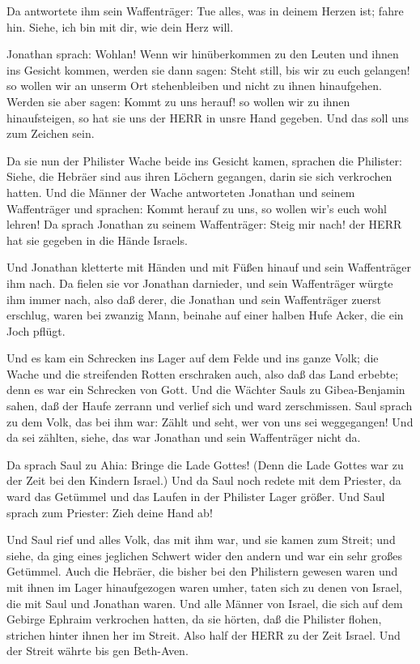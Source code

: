 Da antwortete ihm sein Waffenträger: Tue alles, was in
deinem Herzen ist; fahre hin. Siehe, ich bin mit dir, wie dein Herz
will.

 Jonathan sprach: Wohlan! Wenn wir hinüberkommen zu den
Leuten und ihnen ins Gesicht kommen,  werden sie dann sagen:
Steht still, bis wir zu euch gelangen! so wollen wir an unserm Ort
stehenbleiben und nicht zu ihnen hinaufgehen.  Werden sie
aber sagen: Kommt zu uns herauf! so wollen wir zu ihnen hinaufsteigen,
so hat sie uns der HERR in unsre Hand gegeben. Und das soll uns zum
Zeichen sein.

 Da sie nun der Philister Wache beide ins Gesicht kamen,
sprachen die Philister: Siehe, die Hebräer sind aus ihren Löchern
gegangen, darin sie sich verkrochen hatten.  Und die Männer
der Wache antworteten Jonathan und seinem Waffenträger und sprachen:
Kommt herauf zu uns, so wollen wir's euch wohl lehren! Da sprach
Jonathan zu seinem Waffenträger: Steig mir nach! der HERR hat sie
gegeben in die Hände Israels.

 Und Jonathan kletterte mit Händen und mit Füßen hinauf und
sein Waffenträger ihm nach. Da fielen sie vor Jonathan darnieder, und
sein Waffenträger würgte ihm immer nach,  also daß derer,
die Jonathan und sein Waffenträger zuerst erschlug, waren bei zwanzig
Mann, beinahe auf einer halben Hufe Acker, die ein Joch pflügt.

 Und es kam ein Schrecken ins Lager auf dem Felde und ins
ganze Volk; die Wache und die streifenden Rotten erschraken auch, also
daß das Land erbebte; denn es war ein Schrecken von Gott. 
Und die Wächter Sauls zu Gibea-Benjamin sahen, daß der Haufe zerrann und
verlief sich und ward zerschmissen.  Saul sprach zu dem
Volk, das bei ihm war: Zählt und seht, wer von uns sei weggegangen! Und
da sei zählten, siehe, das war Jonathan und sein Waffenträger nicht da.

 Da sprach Saul zu Ahia: Bringe die Lade Gottes! (Denn die
Lade Gottes war zu der Zeit bei den Kindern Israel.)  Und
da Saul noch redete mit dem Priester, da ward das Getümmel und das
Laufen in der Philister Lager größer. Und Saul sprach zum Priester: Zieh
deine Hand ab!

 Und Saul rief und alles Volk, das mit ihm war, und sie
kamen zum Streit; und siehe, da ging eines jeglichen Schwert wider den
andern und war ein sehr großes Getümmel.  Auch die Hebräer,
die bisher bei den Philistern gewesen waren und mit ihnen im Lager
hinaufgezogen waren umher, taten sich zu denen von Israel, die mit Saul
und Jonathan waren.  Und alle Männer von Israel, die sich
auf dem Gebirge Ephraim verkrochen hatten, da sie hörten, daß die
Philister flohen, strichen hinter ihnen her im Streit. 
Also half der HERR zu der Zeit Israel. Und der Streit währte bis gen
Beth-Aven.

